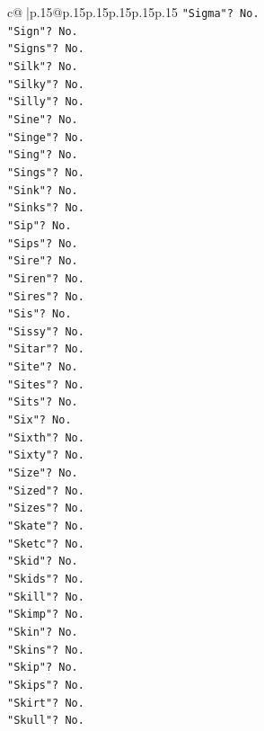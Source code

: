 \documentclass{article}
\begin{document}
{\begin{supertabular}{c@{$\;$}|p{.15\linewidth}@{}p{.15\linewidth}p{.15\linewidth}p{.15\linewidth}p{.15\linewidth}p{.15\linewidth}}
{{{\texttt{"Sigma"? No.} \\
\texttt{"Sign"? No.} \\
\texttt{"Signs"? No.} \\
\texttt{"Silk"? No.} \\
\texttt{"Silky"? No.} \\
\texttt{"Silly"? No.} \\
\texttt{"Sine"? No.} \\
\texttt{"Singe"? No.} \\
\texttt{"Sing"? No.} \\
\texttt{"Sings"? No.} \\
\texttt{"Sink"? No.} \\
\texttt{"Sinks"? No.} \\
\texttt{"Sip"? No.} \\
\texttt{"Sips"? No.} \\
\texttt{"Sire"? No.} \\
\texttt{"Siren"? No.} \\
\texttt{"Sires"? No.} \\
\texttt{"Sis"? No.} \\
\texttt{"Sissy"? No.} \\
\texttt{"Sitar"? No.} \\
\texttt{"Site"? No.} \\
\texttt{"Sites"? No.} \\
\texttt{"Sits"? No.} \\
\texttt{"Six"? No.} \\
\texttt{"Sixth"? No.} \\
\texttt{"Sixty"? No.} \\
\texttt{"Size"? No.} \\
\texttt{"Sized"? No.} \\
\texttt{"Sizes"? No.} \\
\texttt{"Skate"? No.} \\
\texttt{"Sketc"? No.} \\
\texttt{"Skid"? No.} \\
\texttt{"Skids"? No.} \\
\texttt{"Skill"? No.} \\
\texttt{"Skimp"? No.} \\
\texttt{"Skin"? No.} \\
\texttt{"Skins"? No.} \\
\texttt{"Skip"? No.} \\
\texttt{"Skips"? No.} \\
\texttt{"Skirt"? No.} \\
\texttt{"Skull"? No.} \\
}}}
\end{supertabular}}
\end{document}
